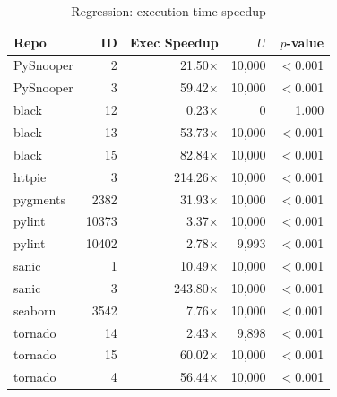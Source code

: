 \begin{table}[htbp]
    \centering
    \caption{Regression: execution time speedup}
    \label{tab:regression_exec}
    \small
    \renewcommand{\arraystretch}{1.2}
    \begin{tabularx}{\linewidth}{@{} >{\raggedright\arraybackslash}X r r r r @{}}
        \toprule
        \textbf{Repo} & \textbf{ID} & \textbf{Exec Speedup} & \textbf{$U$} & \textbf{$p$-value} \\
        \midrule
        PySnooper     & 2           & 21.50$\times$         & 10,000       & $<$0.001           \\
        PySnooper     & 3           & 59.42$\times$         & 10,000       & $<$0.001           \\
        black         & 12          & 0.23$\times$          & 0            & 1.000              \\
        black         & 13          & 53.73$\times$         & 10,000       & $<$0.001           \\
        black         & 15          & 82.84$\times$         & 10,000       & $<$0.001           \\
        httpie        & 3           & 214.26$\times$        & 10,000       & $<$0.001           \\
        pygments      & 2382        & 31.93$\times$         & 10,000       & $<$0.001           \\
        pylint        & 10373       & 3.37$\times$          & 10,000       & $<$0.001           \\
        pylint        & 10402       & 2.78$\times$          & 9,993        & $<$0.001           \\
        sanic         & 1           & 10.49$\times$         & 10,000       & $<$0.001           \\
        sanic         & 3           & 243.80$\times$        & 10,000       & $<$0.001           \\
        seaborn       & 3542        & 7.76$\times$          & 10,000       & $<$0.001           \\
        tornado       & 14          & 2.43$\times$          & 9,898        & $<$0.001           \\
        tornado       & 15          & 60.02$\times$         & 10,000       & $<$0.001           \\
        tornado       & 4           & 56.44$\times$         & 10,000       & $<$0.001           \\
        \bottomrule
    \end{tabularx}
\end{table}

